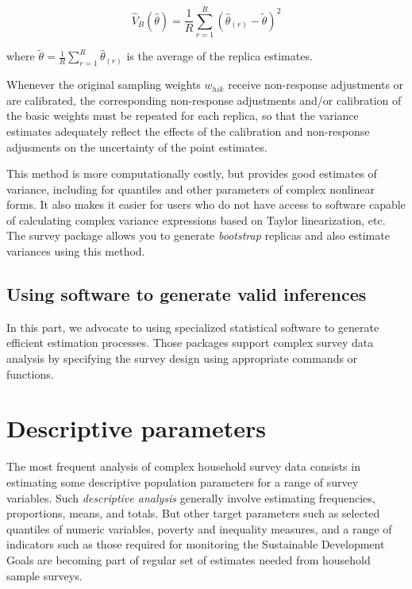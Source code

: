 \documentclass[
  12pt,
]{book}
\begin{document}
\[
\widehat V_{B} \left( \widehat \theta \right) = \frac {1} {R} \sum_{r=1}^R \left( \widehat \theta_{(r)} - \tilde \theta \right)^2
\]

where \(\tilde \theta = \frac 1 R \sum_{r=1}^R \widehat \theta_{(r)}\) is the average of the replica estimates.

Whenever the original sampling weights \(w_{hik}\) receive non-response adjustments or are calibrated, the corresponding non-response adjustments and/or calibration of the basic weights must be repeated for each replica, so that the variance estimates adequately reflect the effects of the calibration and non-response adjusments on the uncertainty of the point estimates.

This method is more computationally costly, but provides good estimates of variance, including for quantiles and other parameters of complex nonlinear forms. It also makes it easier for users who do not have access to software capable of calculating complex variance expressions based on Taylor linearization, etc. The survey package allows you to generate \emph{bootstrap} replicas and also estimate variances using this method.

\section{Using software to generate valid inferences}\label{using-software-to-generate-valid-inferences}

In this part, we advocate to using specialized statistical software to generate efficient estimation processes. Those packages support complex survey data analysis by specifying the survey design using appropriate commands or functions.

\chapter{Descriptive parameters}\label{descriptive-parameters}

The most frequent analysis of complex household survey data consists in estimating some descriptive population parameters for a range of survey variables. Such \emph{descriptive analysis} generally involve estimating frequencies, proportions, means, and totals. But other target parameters such as selected quantiles of numeric variables, poverty and inequality measures, and a range of indicators such as those required for monitoring the Sustainable Development Goals are becoming part of regular set of estimates needed from household sample surveys.
\end{document}
